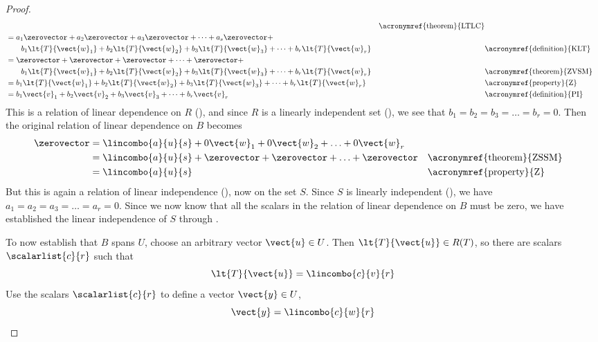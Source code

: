 \begin{proof}
\begin{align*}
&&\text{\acronymref{theorem}{LTLC}}\\
%
&=a_1\zerovector+a_2\zerovector+a_3\zerovector+\cdots+a_s\zerovector+\\
&\quad\quad b_1\lt{T}{\vect{w}_1}+b_2\lt{T}{\vect{w}_2}+b_3\lt{T}{\vect{w}_3}+\cdots+b_r\lt{T}{\vect{w}_r}
&&\text{\acronymref{definition}{KLT}}\\
%
&=\zerovector+\zerovector+\zerovector+\cdots+\zerovector+\\
&\quad\quad b_1\lt{T}{\vect{w}_1}+b_2\lt{T}{\vect{w}_2}+b_3\lt{T}{\vect{w}_3}+\cdots+b_r\lt{T}{\vect{w}_r}
&&\text{\acronymref{theorem}{ZVSM}}\\
%
&=b_1\lt{T}{\vect{w}_1}+b_2\lt{T}{\vect{w}_2}+b_3\lt{T}{\vect{w}_3}+\cdots+b_r\lt{T}{\vect{w}_r}&&\text{\acronymref{property}{Z}}\\
%
&=b_1\vect{v}_1+b_2\vect{v}_2+b_3\vect{v}_3+\cdots+b_r\vect{v}_r&&\text{\acronymref{definition}{PI}}
\end{align*}
%
This is a relation of linear dependence on $R$ (), and since $R$ is a linearly independent set (), we see that $b_1=b_2=b_3=\ldots=b_r=0$.  Then the original relation of linear dependence on $B$ becomes
%
\begin{align*}
\zerovector&=\lincombo{a}{u}{s}+0\vect{w}_1+0\vect{w}_2+\ldots+0\vect{w}_r\\
&=\lincombo{a}{u}{s}+\zerovector+\zerovector+\ldots+\zerovector&&\text{\acronymref{theorem}{ZSSM}}\\
&=\lincombo{a}{u}{s}&&\text{\acronymref{property}{Z}}
\end{align*}
%
But this is again a relation of linear independence (), now on the set $S$.  Since $S$ is linearly independent (), we have $a_1=a_2=a_3=\ldots=a_r=0$.  Since we now know that all the scalars in the relation of linear dependence on $B$ must be zero, we have established the linear independence of $S$ through .\par
%
To now establish that $B$ spans $U$, choose an arbitrary vector $\vect{u}\in U$.  Then $\lt{T}{\vect{u}}\in R(T)$, so there are scalars $\scalarlist{c}{r}$ such that
%
\begin{equation*}
\lt{T}{\vect{u}}=\lincombo{c}{v}{r}
\end{equation*}
%
Use the scalars $\scalarlist{c}{r}$ to define a vector $\vect{y}\in U$,
%
\begin{equation*}
\vect{y}=\lincombo{c}{w}{r}
\end{equation*}

\end{proof}
